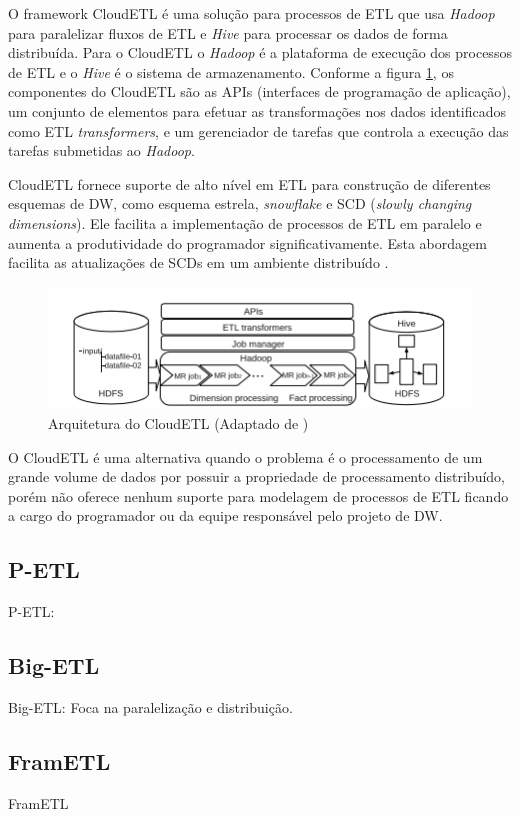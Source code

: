 O framework CloudETL é uma solução para processos de ETL que usa \textit{Hadoop} para paralelizar fluxos de ETL e \textit{Hive} para processar os dados de forma distribuída. Para o CloudETL o \textit{Hadoop} é a plataforma de execução dos processos de ETL e o \textit{Hive} é o sistema de armazenamento. Conforme a figura \ref{cloudetl}, os componentes do CloudETL são as APIs (interfaces de programação de aplicação), um conjunto de elementos para efetuar as transformações nos dados identificados como ETL \textit{transformers}, e um gerenciador de tarefas que controla a execução das tarefas submetidas ao \textit{Hadoop}. 

CloudETL fornece suporte de alto nível em ETL para construção de diferentes esquemas de DW, como esquema estrela, \textit{snowflake} e SCD (\textit{slowly changing dimensions}). Ele facilita a implementação de processos de ETL em paralelo e aumenta a produtividade do programador significativamente. Esta abordagem facilita as atualizações de SCDs em um ambiente distribuído \cite{liu:2013}.

\begin{figure}[h]
	\centering
	\includegraphics[scale=0.7]{fig/cloudetl.png}
	\caption{Arquitetura do CloudETL (Adaptado de \cite{liu:2013})}
	\label{cloudetl}
\end{figure}

O CloudETL é uma alternativa quando o problema é o processamento de um grande volume de dados por possuir a propriedade de processamento distribuído, porém não oferece nenhum suporte para modelagem de processos de ETL ficando a cargo do programador ou da equipe responsável pelo projeto de DW. 


\subsection{P-ETL}
P-ETL:

\subsection{Big-ETL}
Big-ETL: Foca na paralelização e distribuição.

\subsection{FramETL}
FramETL

